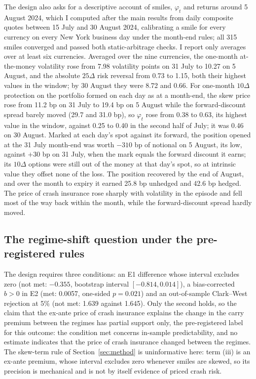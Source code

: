 \documentclass[11pt]{article}
\theoremstyle{result}
\newcommand{\D}{\Delta}
\begin{document}
The design also asks for a descriptive account of smiles, $\varphi_t$ and returns around 5 August 2024, which I computed after the main results from daily composite quotes between 15 July and 30 August 2024, calibrating a smile for every currency on every New York business day under the month-end rules; all 315 smiles converged and passed both static-arbitrage checks. I report only averages over at least six currencies. Averaged over the nine currencies, the one-month at-the-money volatility rose from 7.98 volatility points on 31 July to 10.27 on 5 August, and the absolute $25\D$ risk reversal from 0.73 to 1.15, both their highest values in the window; by 30 August they were 8.72 and 0.66. For one-month $10\D$ protection on the portfolio formed on each day as at a month-end, the skew price rose from 11.2 bp on 31 July to 19.4 bp on 5 August while the forward-discount spread barely moved (29.7 and 31.0 bp), so $\varphi_t$ rose from 0.38 to 0.63, its highest value in the window, against 0.25 to 0.40 in the second half of July; it was 0.46 on 30 August. Marked at each day's spot against its forward, the position opened at the 31 July month-end was worth $-310$ bp of notional on 5 August, its low, against $+30$ bp on 31 July, when the mark equals the forward discount it earns; its $10\D$ options were still out of the money at that day's spot, so at intrinsic value they offset none of the loss. The position recovered by the end of August, and over the month to expiry it earned 25.8 bp unhedged and 42.6 bp hedged. The price of crash insurance rose sharply with volatility in the episode and fell most of the way back within the month, while the forward-discount spread hardly moved.

\subsection{The regime-shift question under the pre-registered rules}

The design requires three conditions: an E1 difference whose interval excludes zero (not met: $-0.355$, bootstrap interval $[-0.814,0.014]$), a bias-corrected $b>0$ in E2 (met: 0.0057, one-sided $p=0.021$) and an out-of-sample Clark--West rejection at 5\% (not met: 1.639 against 1.645). Only the second holds, so the claim that the ex-ante price of crash insurance explains the change in the carry premium between the regimes has partial support only, the pre-registered label for this outcome: the condition met concerns in-sample predictability, and no estimate indicates that the price of crash insurance changed between the regimes. The skew-term rule of Section~\ref{sec:method} is uninformative here: term (iii) is an ex-ante premium, whose interval excludes zero whenever smiles are skewed, so its precision is mechanical and is not by itself evidence of priced crash risk.
\end{document}
